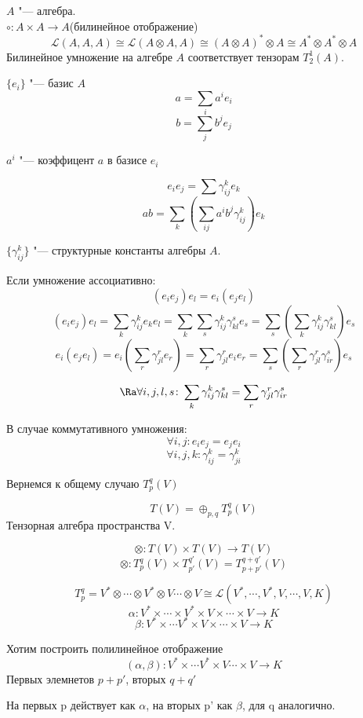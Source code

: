 $A$  "--- алгебра.\\
$\circ \colon A \times A \to A$(билинейное отображение)\\
$$\mathcal{L}(A, A, A) \cong \mathcal{L}(A \otimes A, A) \cong (A \otimes A)^* \otimes A \cong A^* \otimes A^* \otimes A$$
Билинейное умножение на алгебре $A$  соответствует тензорам $T_2^1(A)$.

$\{e_i\}$ "--- базис $A$
$$a = \sum_{i} a^i e_i$$
$$b = \sum_{j} b^j e_j$$

$a^i$ "--- коэффицент $a$ в базисе $e_i$

$$e_ie_j = \sum \gamma_{ij}^ke_k$$
$$ab = \sum_{k}(\sum_{ij}a^ib^j\gamma_{ij}^k)e_k$$

\begin{Def}
$\{\gamma_{ij}^k\}$ "--- структурные константы алгебры $A$.
\end{Def}

Если умножение ассоциативно:
    $$(e_ie_j)e_l = e_i(e_je_l)$$
    $$(e_ie_j)e_l = \sum_k\gamma_{ij}^ke_ke_l = \sum_{k}\sum_{s}\gamma_{ij}^k \gamma_{kl}^s e_s = \sum_s(\sum_k \gamma_{ij}^k \gamma_{kl}^s)e_s$$
    $$e_i(e_je_l) = e_i(\sum_r \gamma_{jl}^re_r) = \sum_{r}\gamma_{jl}^{r}e_ie_r = \sum_s(\sum_r \gamma_{jl}^r\gamma_{ir}^s)e_s$$

    $$\Ra \forall i, j, l, s \colon \sum_{k}\gamma_{ij}^k\gamma_{kl}^s = \sum_r\gamma_{jl}^r\gamma_{ir}^s$$

В случае коммутативного умножения:
    $$\forall i, j \colon e_ie_j = e_je_i$$
    $$\forall i, j, k \colon \gamma_{ij}^k = \gamma_{ji}^k$$


Вернемся  к общему случаю $T_p^q(V)$
\begin{Def}
$$T(V) = \oplus_{p,q}T_{p}^{q}(V)$$
Тензорная алгебра пространства V.
\end{Def}

$$\otimes \colon T(V) \times T(V) \to T(V)$$
$$\otimes \colon T_{p}^{q}(V) \times T_{p'}^{q'}(V) = T_{p + p'}^{q + q'}(V)$$

$$T_{p}^{q} = V^* \otimes \cdots \otimes V^* \otimes V \cdots \otimes V \cong \mathcal{L}(V^*, \cdots, V^*, V, \cdots, V, K)$$
$$\alpha\colon V^* \times \cdots \times V^* \times V \times \cdots \times V \to K$$
$$\beta \colon V^* \times \cdots V^* \times V \times \cdots \times V \to K$$ 

Хотим построить полилинейное отображение 
$$(\alpha, \beta)\colon V^* \times \cdots V^* \times V \cdots \times V \to K$$ 
Первых элемнетов $p + p'$, вторых $q + q'$

На первых p действует как $\alpha$, на вторых p' как $\beta$, для q аналогично. 

